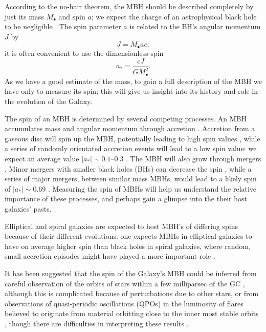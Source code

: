 \documentclass[useAMS,usedcolumn,usegraphicx,usenatbib]{mn2e}
\begin{document}
According to the no-hair theorem, the MBH should be described completely by just its mass $M_\bullet$ and spin $a$; we expect the charge of an astrophysical black hole to be negligible \citep{Israel1967, Israel1968, Carter1971, Hawking1972, Robinson1975, Chandrasekhar1998}. The spin parameter $a$ is related to the BH's angular momentum $J$ by
\begin{equation}
J = M_\bullet ac;
\end{equation}
it is often convenient to use the dimensionless spin
\begin{equation}
a_\ast = \frac{cJ}{GM_\bullet^2}.
\end{equation}
As we have a good estimate of the mass, to gain a full description of the MBH we have only to measure its spin; this will give us insight into its history and role in the evolution of the Galaxy.

The spin of an MBH is determined by several competing processes. An MBH accumulates mass and angular momentum through accretion \citep{Volonteri2010}. Accretion from a gaseous disc will spin up the MBH, potentially leading to high spin values \citep{Volonteri2005}, while a series of randomly orientated accretion events will lead to a low spin value: we expect an average value $|a_\ast| \sim 0.1$--$0.3$ \citep*{King2006, King2008}. The MBH will also grow through mergers \citep{Yu2002, Malbon2007}. Minor mergers with smaller black holes (BHs) can decrease the spin \citep*{Hughes2003, Gammie2004}, while a series of major mergers, between similar mass MBHs, would lead to a likely spin of $|a_\ast| \sim 0.69$ \citep{Berti2008, Berti2007, Gonzalez2007}. Measuring the spin of MBHs will help us understand the relative importance of these processes, and perhaps gain a glimpse into the their host galaxies' pasts.

Elliptical and spiral galaxies are expected to host MBH's of differing spins because of their different evolutions: one expects MBHs in elliptical galaxies to have on average higher spin than black holes in spiral galaxies, where random, small accretion episodes might have played a more important role \citep*{Volonteri2007, Sikora2007}.

It has been suggested that the spin of the Galaxy's MBH could be inferred from careful observation of the orbits of stars within a few milliparsec of the GC \citep{Merritt2010}, although this is complicated because of perturbations due to other stars, or from observations of quasi-periodic oscillations (QPOs) in the luminosity of flares believed to originate from material orbitting close to the inner most stable orbits \citep{Genzel2003a, Belanger2006, Trippe2007, Hamaus2009, Kato2010}, though there are difficulties in interpreting these results \citep{Psaltis2008a}.
\end{document}
